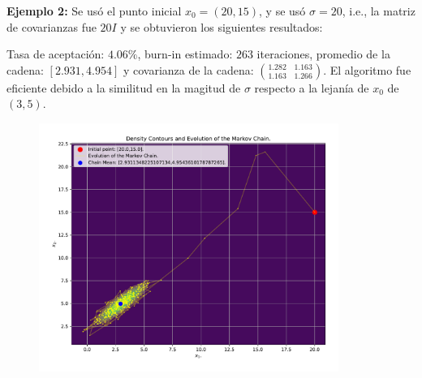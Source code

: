 \textbf{Ejemplo 2:} Se usó el punto inicial $x_0=(20,15)$, y se usó $\sigma = 20$, i.e., la matriz de covarianzas fue $20 I$ y se obtuvieron los siguientes resultados:

Tasa de aceptación: $4.06\%$, burn-in estimado: $263$ iteraciones, promedio de la cadena: $[2.931, 4.954]$ y covarianza de la cadena: $\binom{1.282\quad1.163}{1.163\quad1.266}$. El algoritmo fue eficiente debido a la similitud en la magitud de $\sigma$ respecto a la lejanía de $x_0$ de $(3,5)$.
\begin{figure}[h!]
	\centering
	\includegraphics[width=0.87\textwidth]{IMAGENES/ex3/contour_example2.pdf}
\end{figure}

